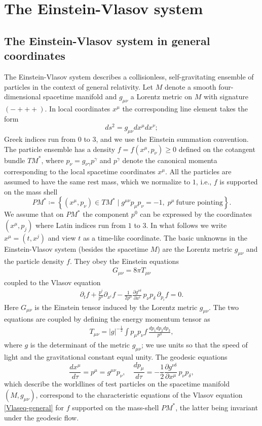 \documentclass[11pt]{article}
\begin{document}
%
%
\section{The Einstein-Vlasov system} \label{section-ev}
\setcounter{equation}{0}
%
%
\subsection{The Einstein-Vlasov system in general coordinates}
%
%
The Einstein-Vlasov system describes a collisionless, self-gravitating
ensemble of particles in the context of general relativity.
Let $M$ denote a smooth four-dimensional spacetime manifold and
$g_{\mu \nu}$ a Lorentz metric on $M$ with signature $(- + + +)$.
In local coordinates $x^\mu$ the corresponding line element takes the form
\[
  ds^2 = g_{\mu \nu} d x^\mu d x^\nu;
\]
Greek indices run from $0$ to $3$,
and we use the Einstein summation convention.
The particle ensemble has a density
$f=f(x^\mu, p_\nu)\geq 0$ defined on the cotangent bundle $TM^*$,
where $p_\nu = g_{\nu \gamma} p^\gamma$ and $p^\gamma$ denote the canonical momenta
corresponding to the local spacetime coordinates $x^\mu$.
All the particles are assumed to have the same rest mass,
which we normalize to $1$,
i.e., $f$ is supported on the mass shell
\[
PM^* \coloneqq
\left\{ (x^\mu, p_\nu) \in TM^* \mid  g^{\mu \nu} p_\mu p_\nu = -1, \;
  p^\mu \ \mbox{future pointing}\right\}.
\]
We assume that on $PM^*$ the component $p^0$ can be expressed by the coordinates
$(x^\mu,p_j)$ where Latin indices run from $1$ to $3$. In what follows we write
$x^\mu = (t,x^j)$ and view $t$ as a time-like coordinate.
The basic unknowns in the Einstein-Vlasov system (besides the spacetime $M$)
are the Lorentz metric $g_{\mu \nu}$
and the particle density $f$. They obey the Einstein equations
\begin{align}\label{EE}
  G_{\mu \nu} = 8 \pi T_{\mu \nu} 
\end{align}
coupled to the Vlasov equation
\begin{align}\label{Vlaseq-general}
  \partial_t f + \frac{p^i}{p^0} \partial_{x^i} f -
  \frac{1}{2p^0} \frac{\partial g^{\nu \delta}}{\partial x^i}
  \, p_\nu p_\delta \, \partial_{p_i}f = 0 .
\end{align}
Here $G_{\mu \nu}$ is the Einstein tensor induced by the Lorentz metric
$g_{\mu \nu}$. The two equations are coupled by defining
the energy momentum tensor as
\begin{align}\label{energymomentumtensor}
  T_{\mu \nu} =  |g|^{-\frac{1}{2}} \int p_\mu p_\nu f \,  \frac{dp_1 dp_2 dp_3}{p^0},
\end{align}		
where $g$ is the determinant of the metric $g_{\mu \nu}$;
we use units so that the speed of light
and the gravitational constant equal unity.
The geodesic equations
\[
\frac{dx^\mu}{d\tau} = p^\mu = g^{\mu \nu} p_\nu, \quad
\frac{dp_\mu}{d\tau} = - \frac{1}{2} \frac{\partial g^{\nu \delta}}{\partial x^\mu}
\, p_\nu p_\delta,
\]
which describe the worldlines of test particles on the spacetime manifold
$(M, g_{\mu \nu})$, correspond to the characteristic equations of the Vlasov
equation \eqref{Vlaseq-general} for $f$ supported on the mass-shell $PM^*$,
the latter being invariant under the geodesic flow.
\end{document}
